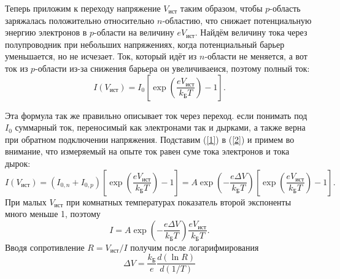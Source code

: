 \documentclass[a4paper,12pt]{article}
\theoremstyle{definition}
\begin{document}
Теперь приложим к переходу напряжение $V_{\text{ист}}$ таким образом, чтобы $p$-область заряжалась положительно относительно $n$-областию, что снижает потенциальную энергию электронов в $p$-области на величину $eV_{\text{ист}}$. Найдём величину тока через полупроводник при небольших напряжениях, когда потенциальный барьер уменьшается, но не исчезает. Ток, который идёт из $n$-области не меняется, а вот ток из $p$-области из-за снижения барьера он увеличиваеися, поэтому полный ток:
\begin{equation}\label{2}
I(V_{\text{ист}})= I_0 \left[\exp\left(\dfrac{eV_{\text{ист}}}{k_\text{Б}T} \right) - 1 \right].
\end{equation}

Эта формула так же правильно описывает ток через переход. если понимать под $I_0$ суммарный ток, переносимый как электронами так и дырками, а также верна при обратном подключении напряжения. Подставим (\ref{1}) в (\ref{2}) и примем во внимание, что измеряемый на опыте ток равен суме тока электронов и тока дырок:
\[I(V_{\text{ист}}) = (I_{0,n} + I_{0,p})\left[\exp\left(\dfrac{eV_{\text{ист}}}{k_\text{Б}T} \right) - 1 \right] = A\exp\left( - \dfrac{e\Delta V}{k_\text{Б}T}\right)\left[\exp\left(\dfrac{eV_{\text{ист}}}{k_\text{Б}T} \right) - 1 \right].\]
При малых $V_{\text{ист}}$ при комнатных температурах показатель второй экспоненты много меньше 1, поэтому
\[I = A\exp\left( - \dfrac{e\Delta V}{k_\text{Б}T}\right) \dfrac{eV_{\text{ист}}}{k_\text{Б}T}.\]
Вводя сопротивление $R = V_{\text{ист}}/I$ получим после логарифмирования
\begin{equation}\label{3}
\boxed{ \Delta V = \dfrac{k_\text{Б}}{e} \dfrac{d(\ln R)}{d(1/T)}}
\end{equation}
\end{document}
